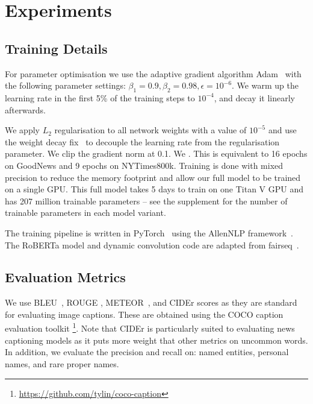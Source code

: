 
\section{Experiments}

\subsection{Training Details}

For parameter optimisation we use the adaptive gradient algorithm
Adam~\cite{Kingma2015Adam} with the following
parameter settings: $\beta_1 = 0.9, \beta_2 = 0.98, \epsilon = 10^{-6}$. We
warm up the
learning rate in the first 5\% of the training steps to $10^{-4}$, and decay
it linearly afterwards.

We apply $L_2$ regularisation to all network weights with a value of $10^{-5}$
and use the weight decay fix~\cite{Loshchilov2018DecoupledWD} to decouple the
learning rate from the regularisation parameter. We clip the gradient norm at
0.1. We . This is equivalent to 16
epochs on GoodNews and 9 epochs on NYTimes800k. Training is done with mixed
precision to reduce the
memory footprint and allow our full model to be trained on a single GPU. This
full model
takes 5 days to train on one Titan V GPU and
has 207 million trainable parameters -- see the supplement for the number of
trainable parameters in each model variant.

The training pipeline is written in PyTorch~\cite{Paszke2017Automatic} using
the AllenNLP framework~\cite{Gardner2017AllenNLP}. The RoBERTa model and
dynamic convolution code are adapted from fairseq~\cite{Ott2019Fairseq}.

\subsection{Evaluation Metrics}

We use BLEU~\cite{Papineni2002Bleu}, ROUGE
\cite{Lin2004ROUGE}, METEOR~\cite{Denkowski2014Meteor}, and CIDEr
\cite{Vedantam2015CIDEr} scores as they are standard for evaluating image
captions. These are obtained using the COCO
caption evaluation toolkit
\footnote{\href{https://github.com/tylin/coco-caption}
{https://github.com/tylin/coco-caption}}. Note that CIDEr is particularly
suited to evaluating news captioning models as it puts more weight that other
metrics on uncommon words. In addition, we evaluate the
precision and recall on: named entities, personal names, and rare proper names.

